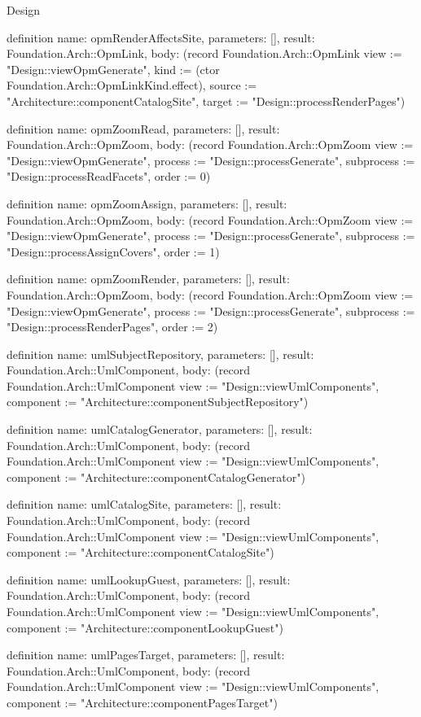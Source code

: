 \begin{lexlean}{Design}
\begin{semanticmodule}
definition{
  name: opmRenderAffectsSite,
  parameters: [],
  result: Foundation.Arch::OpmLink,
  body: (record Foundation.Arch::OpmLink {view := "Design::viewOpmGenerate", kind := (ctor Foundation.Arch::OpmLinkKind.effect), source := "Architecture::componentCatalogSite", target := "Design::processRenderPages"})
}

definition{
  name: opmZoomRead,
  parameters: [],
  result: Foundation.Arch::OpmZoom,
  body: (record Foundation.Arch::OpmZoom {view := "Design::viewOpmGenerate", process := "Design::processGenerate", subprocess := "Design::processReadFacets", order := 0})
}

definition{
  name: opmZoomAssign,
  parameters: [],
  result: Foundation.Arch::OpmZoom,
  body: (record Foundation.Arch::OpmZoom {view := "Design::viewOpmGenerate", process := "Design::processGenerate", subprocess := "Design::processAssignCovers", order := 1})
}

definition{
  name: opmZoomRender,
  parameters: [],
  result: Foundation.Arch::OpmZoom,
  body: (record Foundation.Arch::OpmZoom {view := "Design::viewOpmGenerate", process := "Design::processGenerate", subprocess := "Design::processRenderPages", order := 2})
}

definition{
  name: umlSubjectRepository,
  parameters: [],
  result: Foundation.Arch::UmlComponent,
  body: (record Foundation.Arch::UmlComponent {view := "Design::viewUmlComponents", component := "Architecture::componentSubjectRepository"})
}

definition{
  name: umlCatalogGenerator,
  parameters: [],
  result: Foundation.Arch::UmlComponent,
  body: (record Foundation.Arch::UmlComponent {view := "Design::viewUmlComponents", component := "Architecture::componentCatalogGenerator"})
}

definition{
  name: umlCatalogSite,
  parameters: [],
  result: Foundation.Arch::UmlComponent,
  body: (record Foundation.Arch::UmlComponent {view := "Design::viewUmlComponents", component := "Architecture::componentCatalogSite"})
}

definition{
  name: umlLookupGuest,
  parameters: [],
  result: Foundation.Arch::UmlComponent,
  body: (record Foundation.Arch::UmlComponent {view := "Design::viewUmlComponents", component := "Architecture::componentLookupGuest"})
}

definition{
  name: umlPagesTarget,
  parameters: [],
  result: Foundation.Arch::UmlComponent,
  body: (record Foundation.Arch::UmlComponent {view := "Design::viewUmlComponents", component := "Architecture::componentPagesTarget"})
}


\end{semanticmodule}
\end{lexlean}

